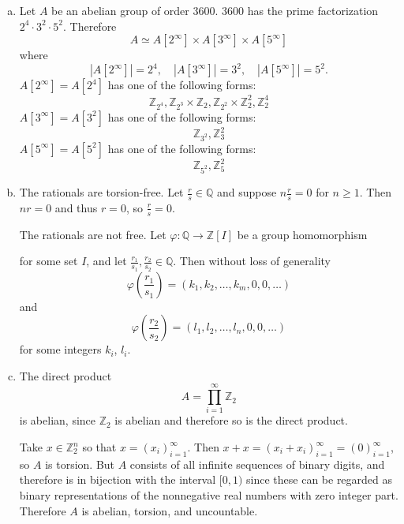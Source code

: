 \documentclass{article}
\begin{document}
\begin{Answer}
\begin{enumerate}[(a)]
  \item{
    Let $A$ be an abelian group of order 3600.
    3600 has the prime factorization $2^4 \cdot 3^2 \cdot
    5^2$. Therefore
    $$
    A \simeq A[2^\infty] \times A[3^\infty] \times A[5^\infty]
    $$
    where
    $$
    |A[2^\infty]| = 2^4, \quad
    |A[3^\infty]| = 3^2, \quad
    |A[5^\infty]| = 5^2.
    $$
    $A[2^\infty] = A[2^4]$ has one of the following forms:
    $$
    \mathbb{Z}_{2^4},
    \mathbb{Z}_{2^3} \times \mathbb{Z}_{2},
    \mathbb{Z}_{2^2} \times \mathbb{Z}_{2}^2,
    \mathbb{Z}_{2}^4
    $$
    $A[3^\infty] = A[3^2]$ has one of the following forms:
    $$
    \mathbb{Z}_{3^2}, \mathbb{Z}_{3}^2
    $$
    $A[5^\infty] = A[5^2]$ has one of the following forms:
    $$
    \mathbb{Z}_{5^2}, \mathbb{Z}_{5}^2
    $$


  }
  \item{
    The rationals are torsion-free. Let $\frac{r}{s} \in
    \mathbb{Q}$ and suppose $n \frac{r}{s} = 0$ for $n \geq 1$.
    Then $n r = 0$ and thus $r = 0$, so $\frac{r}{s} = 0$.

    The rationals are not free. Let
    $\varphi : \mathbb{Q} \to \mathbb{Z}[I]$ be a group homomorphism

    for some set $I$, and let $\frac{r_1}{s_1}, \frac{r_2}{s_2} \in
    \mathbb{Q}$. Then without loss of generality
    $$
    \varphi\left(\frac{r_1}{s_1}\right) =
      (k_1, k_2, \dots, k_m, 0, 0, \dots)
    $$
    and
    $$
    \varphi\left(\frac{r_2}{s_2}\right) =
      (l_1, l_2, \dots, l_n, 0, 0, \dots)
    $$
    for some integers $k_i$, $l_i$.
  }
  \item{
    The direct product
    $$
    A = \prod_{i=1}^\infty \mathbb{Z}_2
    $$
    is abelian, since $\mathbb{Z}_2$ is abelian and therefore so is
    the direct product.

    Take $x \in \mathbb{Z}_2^n$ so that $x = (x_i)_{i=1}^\infty$. Then
    $x + x = (x_i + x_i)_{i=1}^\infty = (0)_{i=1}^\infty$, so $A$ is torsion.
    But $A$ consists of all infinite sequences of binary digits, and
    therefore is in bijection with the interval $[0, 1)$ since these
    can be regarded as binary representations of the nonnegative real
    numbers with zero integer part.
    Therefore $A$ is abelian, torsion, and uncountable.
  }
\end{enumerate}
\end{Answer}

\pagebreak
\end{document}

